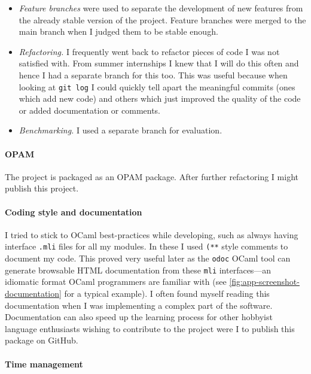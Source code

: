 \documentclass[class=article, crop=false]{standalone}
\begin{document}
\begin{itemize}
\item
\emph{Feature branches} were used to separate the development of new
features from the already stable version of the project. Feature branches were 
merged to the main branch when I judged them to be stable enough.

\item 
\emph{Refactoring.} I frequently went back to refactor pieces of code I was
not satisfied with. From summer internships I knew that I will do this often
and hence I had a separate branch for this too. This was useful because when
looking at \verb|git log| I could quickly tell apart the meaningful commits
(ones which add new code) and others which just improved the quality of the
code or added documentation or comments.

\item
\emph{Benchmarking.} I used a separate branch for evaluation.
\end{itemize}

\paragraph{OPAM}

The project is packaged as an OPAM package. After further refactoring I might publish this project.

\paragraph{Coding style and documentation}

I tried to stick to OCaml best-practices while developing, such as always
having interface \verb|.mli| files for all my modules.
In these I used \verb|(**| style comments to document my code. This proved very
useful later as the \verb|odoc| OCaml tool can generate browsable HTML
documentation from these \verb|mli| interfaces---an idiomatic format OCaml
programmers are familiar with (see \autoref{fig:app-screenshot-documentation} for a typical example).
I often found myself reading this documentation when I was implementing a complex
part of the software. Documentation can also speed up the learning
process for other hobbyist language enthusiasts wishing to contribute to the
project were I to publish this package on GitHub.

\paragraph{Time management}
\end{document}
